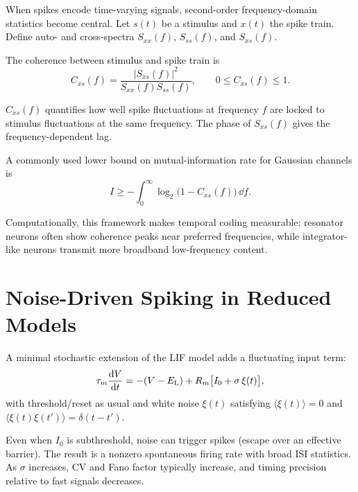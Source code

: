 When spikes encode time-varying signals, second-order frequency-domain statistics become central. Let $s(t)$ be a stimulus and $x(t)$ the spike train. Define auto- and cross-spectra $S_{xx}(f)$, $S_{ss}(f)$, and $S_{xs}(f)$.

The coherence between stimulus and spike train is
%
\begin{equation}
  C_{xs}(f) = \frac{|S_{xs}(f)|^2}{S_{xx}(f)S_{ss}(f)},
  \qquad 0 \le C_{xs}(f) \le 1.
  \label{eq:coherence}
\end{equation}
%

$C_{xs}(f)$ quantifies how well spike fluctuations at frequency $f$ are locked to stimulus fluctuations at the same frequency. The phase of $S_{xs}(f)$ gives the frequency-dependent lag.

A commonly used lower bound on mutual-information rate for Gaussian channels is
%
\begin{equation}
  I \ge -\int_0^{\infty} \log_2\!\bigl(1-C_{xs}(f)\bigr)\,\dd f.
  \label{eq:info-coherence}
\end{equation}
%

Computationally, this framework makes temporal coding measurable: resonator neurons often show coherence peaks near preferred frequencies, while integrator-like neurons transmit more broadband low-frequency content.

\section{Noise-Driven Spiking in Reduced Models}
\label{sec:noise-driven-lif}

A minimal stochastic extension of the LIF model adds a fluctuating input term:
%
\begin{equation}
  \tau_m \frac{\mathop{}\!\mathrm{d} V}{\mathop{}\!\mathrm{d} t} = -(V-E_{\mathrm{L}}) + R_m\bigl[I_0 + \sigma\,\xi(t)\bigr],
  \label{eq:stoch-lif}
\end{equation}
%
with threshold/reset as usual and white noise $\xi(t)$ satisfying
$\langle \xi(t) \rangle=0$ and
$\langle \xi(t)\xi(t') \rangle=\delta(t-t')$.

Even when $I_0$ is subthreshold, noise can trigger spikes (escape over an effective barrier). The result is a nonzero spontaneous firing rate with broad ISI statistics. As $\sigma$ increases, CV and Fano factor typically increase, and timing precision relative to fast signals decreases.

